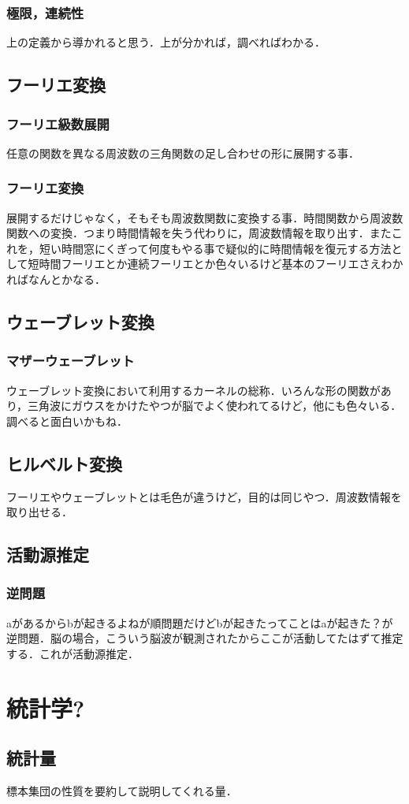 \documentclass[11pt,a4paper]{jreport}
\begin{document}
\subsection{極限，連続性}
上の定義から導かれると思う．上が分かれば，調べればわかる．
\section{フーリエ変換}
\subsection{フーリエ級数展開}
任意の関数を異なる周波数の三角関数の足し合わせの形に展開する事．
\subsection{フーリエ変換}
展開するだけじゃなく，そもそも周波数関数に変換する事．時間関数から周波数関数への変換．つまり時間情報を失う代わりに，周波数情報を取り出す．またこれを，短い時間窓にくぎって何度もやる事で疑似的に時間情報を復元する方法として短時間フーリエとか連続フーリエとか色々いるけど基本のフーリエさえわかればなんとかなる．
\section{ウェーブレット変換}
\subsection{マザーウェーブレット}
ウェーブレット変換において利用するカーネルの総称．いろんな形の関数があり，三角波にガウスをかけたやつが脳でよく使われてるけど，他にも色々いる．調べると面白いかもね．
\section{ヒルベルト変換}
フーリエやウェーブレットとは毛色が違うけど，目的は同じやつ．周波数情報を取り出せる．
\section{活動源推定}
\subsection{逆問題}
aがあるからbが起きるよねが順問題だけどbが起きたってことはaが起きた？が逆問題．脳の場合，こういう脳波が観測されたからここが活動してたはずて推定する．これが活動源推定．
\chapter{統計学?}
\section{統計量}
標本集団の性質を要約して説明してくれる量．
\end{document}
